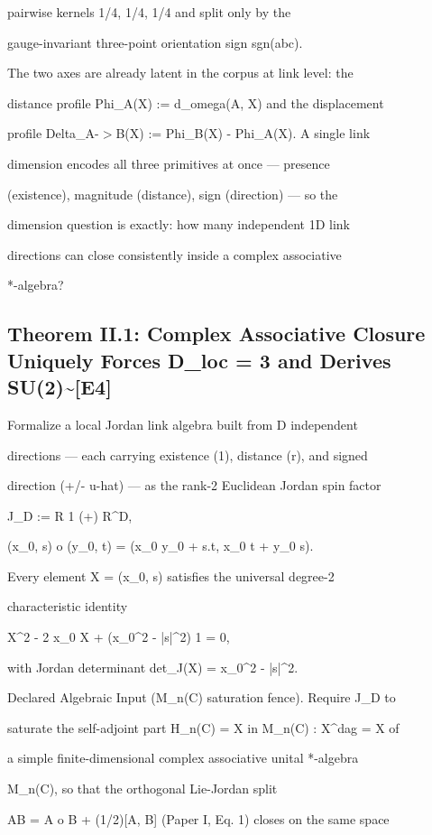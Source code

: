 \documentclass[11pt,a4paper]{article}
\theoremstyle{definition}
\begin{document}
pairwise kernels {1/4, 1/4, 1/4} and split only by the

gauge-invariant three-point orientation sign sgn(abc).


The two axes are already latent in the corpus at link level: the

distance profile Phi\_A(X) := d\_omega(A, X) and the displacement

profile Delta\_{A-$>$B}(X) := Phi\_B(X) - Phi\_A(X). A single link

dimension encodes all three primitives at once — presence

(existence), magnitude (distance), sign (direction) — so the

dimension question is exactly: how many independent 1D link

directions can close consistently inside a complex associative

*-algebra?


\subsection{Theorem II.1: Complex Associative Closure Uniquely Forces D\_loc = 3 and Derives SU(2)\textasciitilde{}[\textsc{E4}]}
Formalize a local Jordan link algebra built from D independent

directions — each carrying existence (1), distance (r), and signed

direction (+/- u-hat) — as the rank-2 Euclidean Jordan spin factor


    J\_D := R 1 (+) R\^{}D,

    (x\_0, s) o (y\_0, t) = (x\_0 y\_0 + s.t,  x\_0 t + y\_0 s).


Every element X = (x\_0, s) satisfies the universal degree-2

characteristic identity


    X\^{}2 - 2 x\_0 X + (x\_0\^{}2 - |s|\^{}2) 1 = 0,


with Jordan determinant det\_J(X) = x\_0\^{}2 - |s|\^{}2.


Declared Algebraic Input (M\_n(C) saturation fence). Require J\_D to

saturate the self-adjoint part H\_n(C) = {X in M\_n(C) : X\^{}dag = X} of

a simple finite-dimensional complex associative unital *-algebra

M\_n(C), so that the orthogonal Lie-Jordan split

AB = A o B + (1/2)[A, B] (Paper I, Eq. 1) closes on the same space
\end{document}
